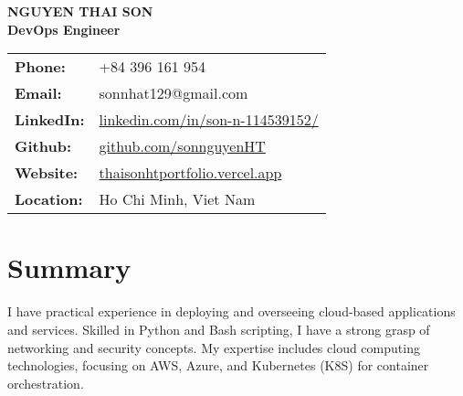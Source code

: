 \documentclass[a4paper,10pt]{article}
\begin{document}
\begin{center}
    {\Huge \textbf{NGUYEN THAI SON}} \\
    \vspace{6pt}
    \textbf{DevOps Engineer} \\
    \vspace{6pt}
    \begin{tabular}{ll}
        \textbf{Phone:} & +84 396 161 954 \\
        \textbf{Email:} & sonnhat129@gmail.com \\
        \textbf{LinkedIn:} & \href{https://www.linkedin.com/in/son-n-114539152/}{linkedin.com/in/son-n-114539152/} \\
        \textbf{Github:} & \href{https://github.com/sonnguyenHT}{github.com/sonnguyenHT} \\
        \textbf{Website:} & \href{https://thaisonhtportfolio.vercel.app/}{thaisonhtportfolio.vercel.app} \\
        \textbf{Location:} & Ho Chi Minh, Viet Nam \\
    \end{tabular}
\end{center}

\vspace{10pt}
\section*{Summary}
I have practical experience in deploying and overseeing cloud-based applications and services. Skilled in Python and Bash scripting, I have a strong grasp of networking and security concepts. My expertise includes cloud computing technologies, focusing on AWS, Azure, and Kubernetes (K8S) for container orchestration.

\vspace{5pt}
\end{document}
